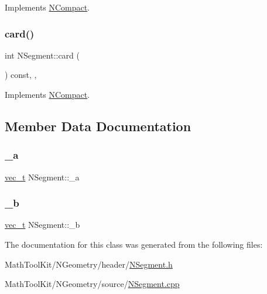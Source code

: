 Implements \mbox{\hyperlink{class_n_compact_a574764d7ac4fe2393a739b67bf57a7f1}{N\+Compact}}.

\mbox{\label{class_n_segment_a2fbe9d64e08f8aaa60d09ba8fe0ca2ba}} 
\subsubsection{\texorpdfstring{card()}{card()}}
{\footnotesize\ttfamily int N\+Segment\+::card (\begin{DoxyParamCaption}{ }\end{DoxyParamCaption}) const\hspace{0.3cm}{\ttfamily [override]}, {\ttfamily [protected]}, {\ttfamily [virtual]}}



Implements \mbox{\hyperlink{class_n_compact_a816bb4976567a7bfed57763ce717b685}{N\+Compact}}.



\subsection{Member Data Documentation}
\mbox{\label{class_n_segment_ae97f9d86f36042b6d90f202c266c5fa2}} 
\subsubsection{\texorpdfstring{\_a}{\_a}}
{\footnotesize\ttfamily \mbox{\hyperlink{_n_vector_8h_a0a2cfc67e738a3d73e4f12098c4c07f6}{vec\+\_\+t}} N\+Segment\+::\+\_\+a\hspace{0.3cm}{\ttfamily [protected]}}

\mbox{\label{class_n_segment_a46d4842dffd0446c07a92704dd527096}} 
\subsubsection{\texorpdfstring{\_b}{\_b}}
{\footnotesize\ttfamily \mbox{\hyperlink{_n_vector_8h_a0a2cfc67e738a3d73e4f12098c4c07f6}{vec\+\_\+t}} N\+Segment\+::\+\_\+b\hspace{0.3cm}{\ttfamily [protected]}}



The documentation for this class was generated from the following files\+:\begin{DoxyCompactItemize}
\item 
Math\+Tool\+Kit/\+N\+Geometry/header/\mbox{\hyperlink{_n_segment_8h}{N\+Segment.\+h}}\item 
Math\+Tool\+Kit/\+N\+Geometry/source/\mbox{\hyperlink{_n_segment_8cpp}{N\+Segment.\+cpp}}\end{DoxyCompactItemize}
